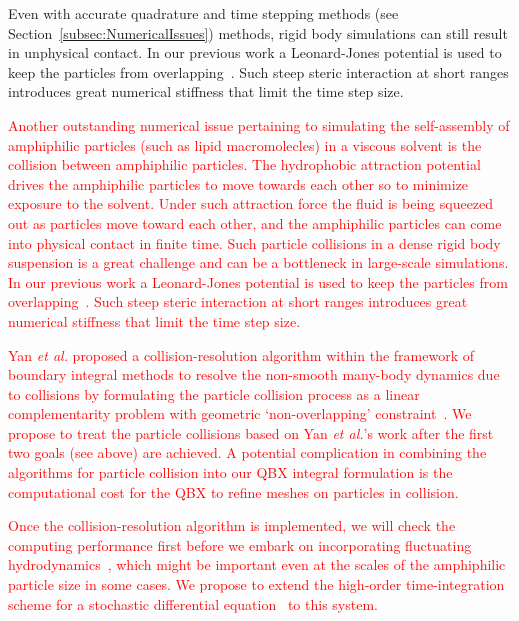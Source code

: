 Even with accurate quadrature and time stepping methods (see
Section~\ref{subsec:NumericalIssues}) methods, rigid body simulations
can still result in unphysical contact. In our previous work a
Leonard-Jones potential is used to keep the particles from
overlapping~\cite{Fu2018_SIAM}. Such steep steric interaction at short
ranges introduces great numerical stiffness that limit the time step
size. 

\textcolor{red}{
Another outstanding numerical issue pertaining to simulating the
self-assembly of amphiphilic particles (such as lipid macromolecles) in
a viscous solvent is the collision between amphiphilic particles. The
hydrophobic attraction potential drives the amphiphilic particles to
move towards each other so to minimize exposure to the solvent. Under
such attraction force the fluid is being squeezed out as particles move
toward each other, and the amphiphilic particles can come into physical
contact in finite time. Such particle collisions in a dense rigid body
suspension is a great challenge and can be a bottleneck in large-scale
simulations. In our previous work a Leonard-Jones potential is used to
keep the particles from overlapping~\cite{Fu2018_SIAM}. Such steep
steric interaction at short ranges introduces great numerical stiffness
that limit the time step size. 
}

\textcolor{red}{
Yan {\it et al.} proposed a collision-resolution algorithm within the
framework of boundary integral methods to resolve the non-smooth
many-body dynamics due to collisions by formulating the particle
collision process as a linear complementarity problem with geometric
`non-overlapping' constraint~\cite{Yan2019}. We propose to treat the
particle collisions based on Yan {\it et al.}'s work after the first two
goals (see above) are achieved. A potential complication in combining
the algorithms for particle collision into our QBX integral formulation
is the computational cost for the QBX to refine meshes on particles in
collision.
}

\textcolor{red}{
Once the collision-resolution algorithm is implemented, we will check
the computing performance first before we embark on incorporating
fluctuating hydrodynamics~\cite{Bao17,Bao18}, which might be important
even at the scales of the amphiphilic particle size in some cases. We
propose to extend the high-order time-integration scheme for a
stochastic differential equation~\cite{fu2015pre} to this system.
}


